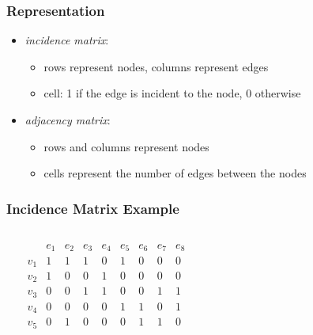 \documentclass[dvipsnames]{beamer}
\begin{document}
\begin{frame}
  \frametitle{Representation}

  \begin{itemize}
    \item \emph{incidence matrix}:
    \begin{itemize}
      \item rows represent nodes, columns represent edges
      \item cell: 1 if the edge is incident to the node, 0 otherwise
    \end{itemize}

    \pause
    \medskip
    \item \emph{adjacency matrix}:
    \begin{itemize}
      \item rows and columns represent nodes
      \item cells represent the number of edges between the nodes
    \end{itemize}
  \end{itemize}
\end{frame}

\begin{frame}
  \frametitle{Incidence Matrix Example}

  \begin{example}
    \begin{columns}
      \begin{center}
      \end{center}

      \[
        \begin{array}{c|cccccccc}
              & e_1 & e_2 & e_3 & e_4 & e_5 & e_6 & e_7 & e_8\\\hline
          v_1 & 1 & 1 & 1 & 0 & 1 & 0 & 0 & 0\\
          v_2 & 1 & 0 & 0 & 1 & 0 & 0 & 0 & 0\\
          v_3 & 0 & 0 & 1 & 1 & 0 & 0 & 1 & 1\\
          v_4 & 0 & 0 & 0 & 0 & 1 & 1 & 0 & 1\\
          v_5 & 0 & 1 & 0 & 0 & 0 & 1 & 1 & 0
        \end{array}
      \]
    \end{columns}
  \end{example}
\end{frame}
\end{document}
